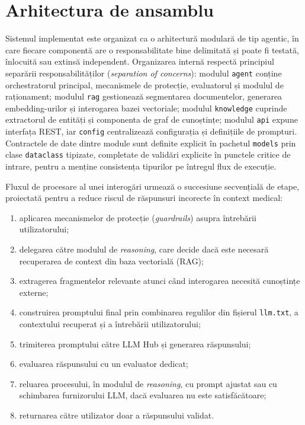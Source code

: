 \documentclass[12pt, a4paper, oneside, romanian]{teza-upb}
\begin{document}
\section{Arhitectura de ansamblu}

Sistemul implementat este organizat ca o arhitectură modulară de tip agentic, în care fiecare componentă are o responsabilitate bine delimitată și poate fi testată, înlocuită sau extinsă independent. Organizarea internă respectă principiul separării responsabilităților (\textit{separation of concerns}): modulul \texttt{agent} conține orchestratorul principal, mecanismele de protecție, evaluatorul și modulul de raționament; modulul \texttt{rag} gestionează segmentarea documentelor, generarea embedding-urilor și interogarea bazei vectoriale; modulul \texttt{knowledge} cuprinde extractorul de entități și componenta de graf de cunoștințe; modulul \texttt{api} expune interfața REST, iar \texttt{config} centralizează configurația și definițiile de prompturi. Contractele de date dintre module sunt definite explicit în pachetul \texttt{models} prin clase \texttt{dataclass} tipizate, completate de validări explicite în punctele critice de intrare, pentru a menține consistența tipurilor pe întregul flux de execuție.

Fluxul de procesare al unei interogări urmează o succesiune secvențială de etape, proiectată pentru a reduce riscul de răspunsuri incorecte în context medical:

\begin{enumerate}
    \item aplicarea mecanismelor de protecție (\textit{guardrails}) asupra întrebării utilizatorului;
    \item delegarea către modulul de \textit{reasoning}, care decide dacă este necesară recuperarea de context din baza vectorială (RAG);
    \item extragerea fragmentelor relevante atunci când interogarea necesită cunoștințe externe;
    \item construirea promptului final prin combinarea regulilor din fișierul \texttt{llm.txt}, a contextului recuperat și a întrebării utilizatorului;
    \item trimiterea promptului către LLM Hub și generarea răspunsului;
    \item evaluarea răspunsului cu un evaluator dedicat;
    \item reluarea procesului, în modulul de \textit{reasoning}, cu prompt ajustat sau cu schimbarea furnizorului LLM, dacă evaluarea nu este satisfăcătoare;
    \item returnarea către utilizator doar a răspunsului validat.
\end{enumerate}
\end{document}
